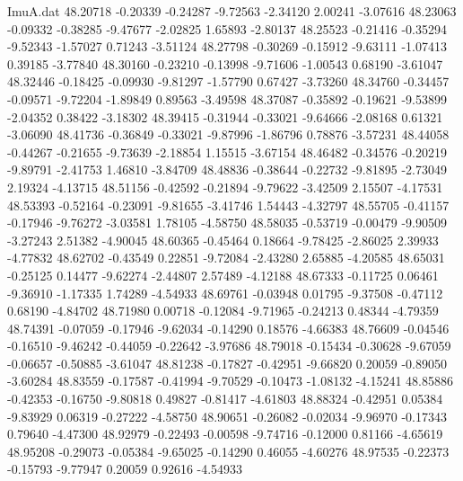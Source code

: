 \begin{filecontents}{ImuA.dat}
  48.20718   -0.20339   -0.24287   -9.72563   -2.34120    2.00241   -3.07616
  48.23063   -0.09332   -0.38285   -9.47677   -2.02825    1.65893   -2.80137
  48.25523   -0.21416   -0.35294   -9.52343   -1.57027    0.71243   -3.51124
  48.27798   -0.30269   -0.15912   -9.63111   -1.07413    0.39185   -3.77840
  48.30160   -0.23210   -0.13998   -9.71606   -1.00543    0.68190   -3.61047
  48.32446   -0.18425   -0.09930   -9.81297   -1.57790    0.67427   -3.73260
  48.34760   -0.34457   -0.09571   -9.72204   -1.89849    0.89563   -3.49598
  48.37087   -0.35892   -0.19621   -9.53899   -2.04352    0.38422   -3.18302
  48.39415   -0.31944   -0.33021   -9.64666   -2.08168    0.61321   -3.06090
  48.41736   -0.36849   -0.33021   -9.87996   -1.86796    0.78876   -3.57231
  48.44058   -0.44267   -0.21655   -9.73639   -2.18854    1.15515   -3.67154
  48.46482   -0.34576   -0.20219   -9.89791   -2.41753    1.46810   -3.84709
  48.48836   -0.38644   -0.22732   -9.81895   -2.73049    2.19324   -4.13715
  48.51156   -0.42592   -0.21894   -9.79622   -3.42509    2.15507   -4.17531
  48.53393   -0.52164   -0.23091   -9.81655   -3.41746    1.54443   -4.32797
  48.55705   -0.41157   -0.17946   -9.76272   -3.03581    1.78105   -4.58750
  48.58035   -0.53719   -0.00479   -9.90509   -3.27243    2.51382   -4.90045
  48.60365   -0.45464    0.18664   -9.78425   -2.86025    2.39933   -4.77832
  48.62702   -0.43549    0.22851   -9.72084   -2.43280    2.65885   -4.20585
  48.65031   -0.25125    0.14477   -9.62274   -2.44807    2.57489   -4.12188
  48.67333   -0.11725    0.06461   -9.36910   -1.17335    1.74289   -4.54933
  48.69761   -0.03948    0.01795   -9.37508   -0.47112    0.68190   -4.84702
  48.71980    0.00718   -0.12084   -9.71965   -0.24213    0.48344   -4.79359
  48.74391   -0.07059   -0.17946   -9.62034   -0.14290    0.18576   -4.66383
  48.76609   -0.04546   -0.16510   -9.46242   -0.44059   -0.22642   -3.97686
  48.79018   -0.15434   -0.30628   -9.67059   -0.06657   -0.50885   -3.61047
  48.81238   -0.17827   -0.42951   -9.66820    0.20059   -0.89050   -3.60284
  48.83559   -0.17587   -0.41994   -9.70529   -0.10473   -1.08132   -4.15241
  48.85886   -0.42353   -0.16750   -9.80818    0.49827   -0.81417   -4.61803
  48.88324   -0.42951    0.05384   -9.83929    0.06319   -0.27222   -4.58750
  48.90651   -0.26082   -0.02034   -9.96970   -0.17343    0.79640   -4.47300
  48.92979   -0.22493   -0.00598   -9.74716   -0.12000    0.81166   -4.65619
  48.95208   -0.29073   -0.05384   -9.65025   -0.14290    0.46055   -4.60276
  48.97535   -0.22373   -0.15793   -9.77947    0.20059    0.92616   -4.54933

\end{filecontents}
